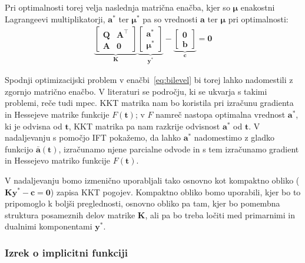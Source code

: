 \documentclass[isrm2, tisk]{fmfdelo}
\newcommand{\aimplicit}{\bar{\mathbf{a}}}
\newcommand{\qmat}{\mathbf{Q}}
\newcommand{\amat}{\mathbf{A}}
\newcommand{\kmat}{\mathbf{K}}
\newcommand{\bvec}{\mathbf{b}}
\newcommand{\avec}{\mathbf{a}}
\newcommand{\tvec}{\mathbf{t}}
\newcommand{\muvec}{\boldsymbol{\mu}}
\begin{document}
Pri optimalnosti torej velja naslednja matrična enačba, kjer so $\muvec$ enakostni Lagrangeevi multiplikatorji, $\mathbf{a^*}$ ter $\muvec^*$ pa so vrednosti $\mathbf{a}$ ter $\muvec$ pri optimalnosti:
\begin{equation}
    \label{eq:kkt_matrix}
    \begin{gathered}
        \underbrace{
            \begin{bmatrix}
                \qmat & \amat^{\top} \\
                \amat & \mathbf{0}
            \end{bmatrix}
        }_{\kmat}
        \underbrace{
            \begin{bmatrix}
                \avec^* \\
                \boldsymbol{\mu}^*
            \end{bmatrix}
        }_{\mathbf{y}^*}
        -
        \underbrace{
            \begin{bmatrix}
                \mathbf{0} \\
                \bvec
            \end{bmatrix}
        }_{\mathbf{c}}
        = \mathbf{0}
    \end{gathered}
\end{equation}

Spodnji optimizacijski problem v enačbi~\eqref{eq:bilevel} bi torej lahko nadomestili z zgornjo matrično enačbo. V literaturi se področju, ki se ukvarja s takimi problemi, reče tudi \ac{mpec}. \ac{KKT} matrika nam bo koristila pri izračunu gradienta in Hessejeve matrike funkcije $F(\tvec)$; v $F$ namreč nastopa optimalna vrednost $\mathbf{a}^*$, ki je odvisna od $\tvec$, \ac{KKT} matrika pa nam razkrije odvisnost $\mathbf{a}^*$ od $\tvec$. V nadaljevanju s pomočjo \ac{IFT} pokažemo, da lahko $\mathbf{a}^*$ nadomestimo z gladko funkcijo $\aimplicit(\tvec)$, izračunamo njene parcialne odvode in s tem izračunamo gradient in Hessejevo matriko funkcije $F(\tvec)$.

V nadaljevanju bomo izmenično uporabljali tako osnovno kot kompaktno obliko ($\kmat \mathbf{y}^* - \mathbf{c} = \mathbf{0}$) zapisa \ac{KKT} pogojev. Kompaktno obliko bomo uporabili, kjer bo to pripomoglo k boljši preglednosti, osnovno obliko pa tam, kjer bo pomembna struktura posameznih delov matrike $\kmat$, ali pa bo treba ločiti med primarnimi in dualnimi komponentami $\mathbf{y}^*$.

\subsubsection{Izrek o implicitni funkciji}
\label{sec:ift}
\end{document}
